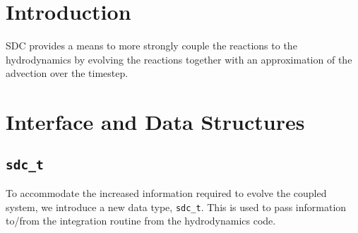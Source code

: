 \section{Introduction}

SDC provides a means to more strongly couple the reactions to the
hydrodynamics by evolving the reactions together with an approximation
of the advection over the timestep.

\section{Interface and Data Structures}

\subsection{\tt sdc\_t}

To accommodate the increased information required to evolve the
coupled system, we introduce a new data type, {\tt sdc\_t}.  This is
used to pass information to/from the integration routine from the
hydrodynamics code.

